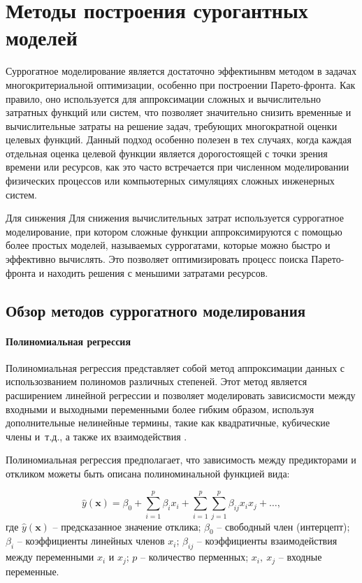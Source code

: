 \section{Методы построения сурогантных моделей}\label{sec:ch4/sec3}
Суррогатное моделирование является достаточно эффектиынвм методом в
задачах многокритериальной оптимизации, особенно при построении
Парето-фронта. Как правило, оно используется для аппроксимации сложных и вычислительно
затратных функций или систем, что позволяет значительно снизить временные и вычислительные
затраты на решение задач, требующих многократной оценки целевых функций. Данный
подход особенно полезен в тех случаях, когда каждая отдельная оценка целевой функции
является дорогостоящей с точки зрения времени или ресурсов, как это часто встречается
при численном моделировании физических процессов или компьютерных симуляциях сложных
инженерных систем.

Для синжения Для снижения вычислительных затрат используется суррогатное моделирование,
при котором сложные функции аппроксимируются с помощью более простых моделей,
называемых суррогатами, которые можно быстро и эффективно вычислять.
Это позволяет оптимизировать процесс поиска Парето-фронта и находить решения
с меньшими затратами ресурсов.



\subsection{Обзор методов суррогатного моделирования}\label{sec:ch4/sec3/subsec1}


\paragraph{Полиномиальная регрессия}\label{sec:ch4/sec3/subsec1/subsubsec1}

Полиномиальная регрессия представляет собой метод аппроксимации данных
с использозванием полиномов различных степеней. Этот метод является расширением линейной
регрессии и позволяет моделировать зависисмости между входными и выходными переменными более
гибким образом, используя дополнительные нелинейные термины, такие как квадратичные, кубические члены
и~т.д., а также их взаимодействия \cite{fan2018local}.

Полиномиальная регрессия предполагает, что зависимость между предикторами и откликом
можеты быть описана полиноминальной функцией вида:

\begin{equation}
    \hat{y}(\mathbf{x}) = \beta_0 + \sum_{i=1}^{p} \beta_i x_i + \sum_{i=1}^{p} \sum_{j=1}^{p} \beta_{ij} x_i x_j + \ldots,
\end{equation}
где $\hat{y}(\mathbf{x})$ -- предсказанное значение отклика;
$\beta_0$ -- свободный член (интерцепт);
$\beta_i$ -- коэффициенты линейных членов $x_i$;
$\beta_{ij}$ -- коэффициенты взаимодействия между переменными $x_i$ и $x_j$;
$p$ -- количество перменных;
$x_i,~x_j$ -- входные переменные.

